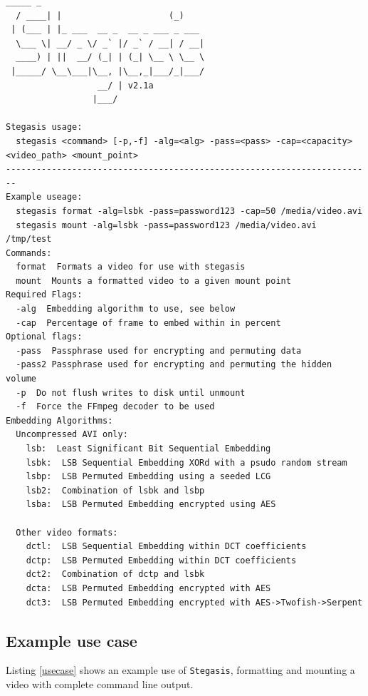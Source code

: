 \documentclass[paper=a4, fontsize=11pt,twoside]{scrartcl}
\numberwithin{table}{section}
\numberwithin{figure}{section}
\numberwithin{algorithm}{section}
\begin{document}
\begin{lstlisting}[language={},caption={\texttt{Stegasis} usage information.},frame=single, upquote=true,label=usage,showstringspaces=false]
   _____ _                                  
  / ____| |                     (_)         
 | (___ | |_ ___  __ _  __ _ ___ _ ___      
  \___ \| __/ _ \/ _` |/ _` / __| / __|  
  ____) | ||  __/ (_| | (_| \__ \ \__ \ 
 |_____/ \__\___|\__, |\__,_|___/_|___/ 
                  __/ | v2.1a               
                 |___/                      

Stegasis usage:
  stegasis <command> [-p,-f] -alg=<alg> -pass=<pass> -cap=<capacity>       <video_path> <mount_point>
------------------------------------------------------------------------
Example useage:
  stegasis format -alg=lsbk -pass=password123 -cap=50 /media/video.avi
  stegasis mount -alg=lsbk -pass=password123 /media/video.avi /tmp/test
Commands:
  format  Formats a video for use with stegasis
  mount  Mounts a formatted video to a given mount point
Required Flags:
  -alg  Embedding algorithm to use, see below
  -cap  Percentage of frame to embed within in percent
Optional flags:
  -pass  Passphrase used for encrypting and permuting data
  -pass2 Passphrase used for encrypting and permuting the hidden volume
  -p  Do not flush writes to disk until unmount
  -f  Force the FFmpeg decoder to be used
Embedding Algorithms:
  Uncompressed AVI only:
    lsb:  Least Significant Bit Sequential Embedding
    lsbk:  LSB Sequential Embedding XORd with a psudo random stream
    lsbp:  LSB Permuted Embedding using a seeded LCG
    lsb2:  Combination of lsbk and lsbp
    lsba:  LSB Permuted Embedding encrypted using AES
    
  Other video formats:
    dctl:  LSB Sequential Embedding within DCT coefficients
    dctp:  LSB Permuted Embedding within DCT coefficients
    dct2:  Combination of dctp and lsbk
    dcta:  LSB Permuted Embedding encrypted with AES
    dct3:  LSB Permuted Embedding encrypted with AES->Twofish->Serpent
\end{lstlisting}

\subsection{Example use case}

Listing \ref{usecase} shows an example use of \texttt{Stegasis}, formatting and mounting a video with complete command line output.
\end{document}

